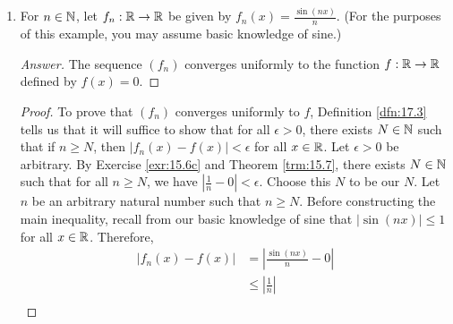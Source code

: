 \documentclass[../main.tex]{subfiles}
\begin{document}
\begin{exercise}
\begin{enumerate}[label={(\alph*)}]
\begin{proof}
            \begin{align*}
                \frac{1}{2^{1/N}} &= \frac{1^{1/N}}{2^{1/N}}\\
                &< \frac{2^{1/N}}{2^{1/N}}\\
                &= 1
            \end{align*}
            for all $N\in\N$, so this is an acceptable $x$. However, we have that
            \begin{align*}
                |f_N(x)-f(x)| &= \left| \left( \frac{1}{2^{1/N}} \right)^N-0 \right|\\
                &= \frac{1}{2}
            \end{align*}
            a contradiction\footnote{Note that as an alternative to this second contradiction argument, we can prove that $(f_n)$ does not converge uniformly to $f$ via the contrapositive of Theorem \ref{trm:17.6}. Indeed, since $f$ has a discontinuity at 1 while each $f_n$ is continuous by Corollary \ref{cly:11.12}, the contrapositive of Theorem \ref{trm:17.6} implies that $(f_n)$ cannot converge uniformly to $f$.}.
        \end{proof}
        \item For $n\in\mathbb{N}$, let $f_n:\mathbb{R}\to\mathbb{R}$ be given by $f_n(x)=\frac{\sin(nx)}{n}$. (For the purposes of this example, you may assume basic knowledge of sine.)
        \begin{proof}[Answer]
            The sequence $(f_n)$ converges uniformly to the function $f:\mathbb{R}\to\mathbb{R}$ defined by $f(x)=0$.
        \end{proof}
        \begin{proof}
            To prove that $(f_n)$ converges uniformly to $f$, Definition \ref{dfn:17.3} tells us that it will suffice to show that for all $\epsilon>0$, there exists $N\in\N$ such that if $n\geq N$, then $|f_n(x)-f(x)|<\epsilon$ for all $x\in\mathbb{R}$. Let $\epsilon>0$ be arbitrary. By Exercise \ref{exr:15.6c} and Theorem \ref{trm:15.7}, there exists $N\in\N$ such that for all $n\geq N$, we have $|\frac{1}{n}-0|<\epsilon$. Choose this $N$ to be our $N$. Let $n$ be an arbitrary natural number such that $n\geq N$. Before constructing the main inequality, recall from our basic knowledge of sine that $|\sin(nx)|\leq 1$ for all $x\in\mathbb{R}$. Therefore,
            \begin{align*}
                |f_n(x)-f(x)| &= \left| \frac{\sin(nx)}{n}-0 \right|\\
                &\leq \left| \frac{1}{n} \right|\\

\end{align*}
\end{proof}
\end{enumerate}
\end{exercise}
\end{document}

